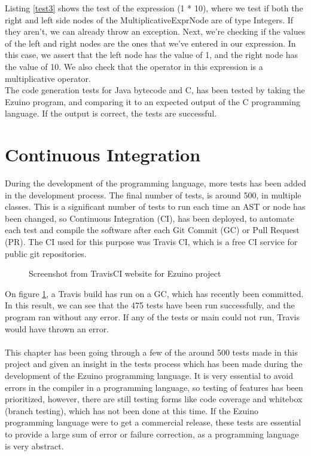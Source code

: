 Listing \ref{test3} shows the test of the expression (1 * 10), where we test if both the right and left side nodes of the MultiplicativeExprNode are of type Integers. If they aren’t, we can already throw an exception. Next, we’re checking if the values of the left and right nodes are the ones that we’ve entered in our expression. In this case, we assert that the left node has the value of 1, and the right node has the value of 10. We also check that the operator in this expression is a multiplicative operator.\\
The code generation tests for Java bytecode and C, has been tested by taking the Ezuino program, and comparing it to an expected output of the C programming language. If the output is correct, the tests are successful.

\noindent\newline

\section{Continuous Integration}
During the development of the programming language, more tests has been added in the development process. The final number of tests, is around 500, in multiple classes. This is a significant number of tests to run each time an AST or node has been changed, so Continuous Integration (CI), has been deployed, to automate each test and compile the software after each Git Commit (GC) or Pull Request (PR).  The CI used for this purpose was Travis CI, which is a free CI service for public git repositories. \\
\begin{figure}[H]
\centering
{}
\caption{Screenshot from TravisCI website for Ezuino project}
\label{testa}
\end{figure}
On figure \ref{testa}, a Travis build has run on a GC, which has recently been committed. In this result, we can see that the 475 tests have been run successfully, and the program ran without any error. If any of the tests or main could not run, Travis would have thrown an error. \\
\\
This chapter has been going through a few of the around 500 tests made in this project and given an insight in the tests process which has been made during the development of the Ezuino programming language. It is very essential to avoid errors in the compiler in a programming language, so testing of features has been prioritized, however, there are still testing forms like code coverage and whitebox (branch testing), which has not been done at this time. If the Ezuino programming language were to get a commercial release, these tests are essential to provide a large sum of error or failure correction, as a programming language is very abstract.

